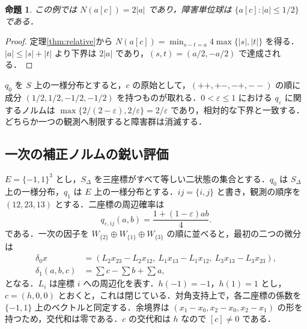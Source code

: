 \documentclass[11pt,a4paper]{article}
\numberwithin{equation}{section}
\theoremstyle{japanese}
\newtheorem{proposition}[theorem]{命題}
\theoremstyle{remark}
\begin{document}
\begin{proposition}
この例では $N(a[c])=2|a|$ であり，障害単位球は $\{a[c]:|a|\le1/2\}$ である．
\end{proposition}
\begin{proof}
定理\ref{thm:relative}から $N(a[c])=\min_{s-t=a}4\max\{|s|,|t|\}$ を得る．$|a|\le|s|+|t|$ より下界は $2|a|$ であり，$(s,t)=(a/2,-a/2)$ で達成される．
\end{proof}
$q_0$ を $S$ 上の一様分布とすると，$c$ の原始として，$(++,+-,-+,--)$ の順に成分 $(1/2,1/2,-1/2,-1/2)$ を持つものが取れる．$0<\varepsilon\le1$ における $q_\varepsilon$ に関するノルムは $\max\{2/(2-\varepsilon),2/\varepsilon\}=2/\varepsilon$ であり，相対的な下界と一致する．どちらか一つの観測へ制限すると障害群は消滅する．

\subsection{一次の補正ノルムの鋭い評価}\label{subsec:triangle}
$E=\{-1,1\}^3$ とし，$S_\Delta$ を三座標がすべて等しい二状態の集合とする．$q_0$ は $S_\Delta$ 上の一様分布，$q_1$ は $E$ 上の一様分布とする．$ij=\{i,j\}$ と書き，観測の順序を $(12,23,13)$ とする．二座標の周辺確率は
\[
 q_{\varepsilon,ij}(a,b)=\frac{1+(1-\varepsilon)ab}{4}.
\]
である．一次の因子を $W_{\{2\}}\oplus W_{\{1\}}\oplus W_{\{3\}}$ の順に並べると，最初の二つの微分は
\begin{align*}
 \delta_0x&=(L_2x_{23}-L_2x_{12},\ L_1x_{13}-L_1x_{12},\ L_3x_{13}-L_3x_{23}),\\
 \delta_1(a,b,c)&=\sum c-\sum b+\sum a,
\end{align*}
となる．$L_i$ は座標 $i$ への周辺化を表す．$h(-1)=-1$，$h(1)=1$ とし，$c=(h,0,0)$ とおくと，これは閉じている．対角支持上で，各二座標の係数を $\{-1,1\}$ 上のベクトルと同定する．余境界は $(x_1-x_0,x_2-x_0,x_2-x_1)$ の形を持つため，交代和は零である．$c$ の交代和は $h$ なので $[c]\ne0$ である．
\end{document}
